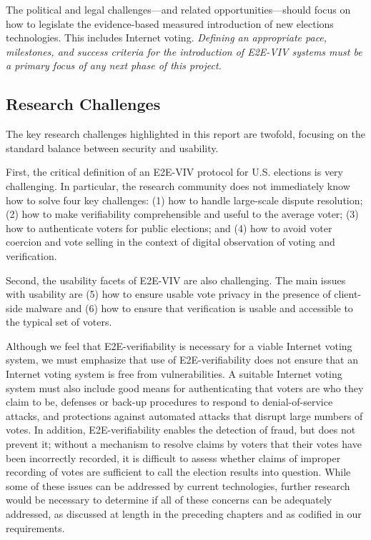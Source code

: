 The political and legal challenges---and related
opportunities---should focus on how to legislate the evidence-based
measured introduction of new elections technologies. This includes
Internet voting. \emph{Defining an appropriate pace, milestones, and
  success criteria for the introduction of E2E-VIV systems must be a
  primary focus of any next phase of this project.}

\subsection{Research Challenges}

The key research challenges highlighted in this report are twofold,
focusing on the standard balance between security and usability.

First, the critical definition of an E2E-VIV protocol for
U.S. elections is very challenging. In particular, the research
community does not immediately know how to solve four key challenges:
(1) how to handle large-scale dispute resolution; (2) how to make
verifiability comprehensible and useful to the average voter; (3) how
to authenticate voters for public elections; and (4) how to avoid
voter coercion and vote selling in the context of digital observation
of voting and verification.

Second, the usability facets of E2E-VIV are also challenging. The main
issues with usability are (5) how to ensure usable vote privacy in the
presence of client-side malware and (6) how to ensure that
verification is usable and accessible to the typical set of voters.

Although we feel that E2E-verifiability is necessary for a viable
Internet voting system, we must emphasize that use of
E2E-verifiability does not ensure that an Internet voting system is
free from vulnerabilities.  A suitable Internet voting system must
also include good means for authenticating that voters are who they
claim to be, defenses or back-up procedures to respond to
denial-of-service attacks, and protections against automated attacks
that disrupt large numbers of votes.  In addition, E2E-verifiability
enables the detection of fraud, but does not prevent it; without a
mechanism to resolve claims by voters that their votes have been
incorrectly recorded, it is difficult to assess whether claims of
improper recording of votes are sufficient to call the election
results into question.  While some of these issues can be addressed by
current technologies, further research would be necessary to determine
if all of these concerns can be adequately addressed, as discussed at
length in the preceding chapters and as codified in our requirements.

